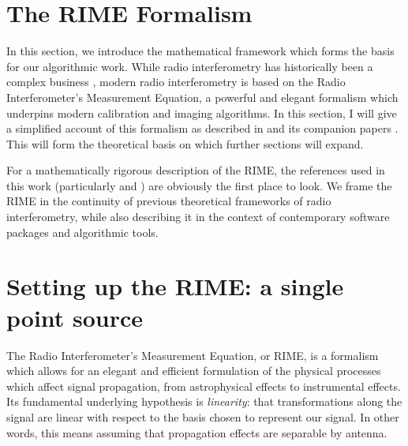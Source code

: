 
\section{The RIME Formalism}\label{section.RIME}

\pg
In this section, we introduce the mathematical framework which forms the basis for our algorithmic work.
While radio interferometry has historically been a complex business , modern radio interferometry is based on the Radio Interferometer's Measurement Equation, a powerful and elegant formalism which underpins modern calibration and imaging algorithms. In this section, I will give a simplified account of this formalism as described in  and its companion papers . This will form the theoretical basis on which further sections will expand.%

\pg
For a mathematically rigorous description of the RIME, the references used in this work (particularly  and ) are obviously the first place to look. We frame the RIME in the continuity of previous theoretical frameworks of radio interferometry, while also describing it in the context of contemporary software packages and algorithmic tools.

\section{Setting up the RIME: a single point source}
\label{section.RIME.setup}

\pg
The Radio Interferometer's Measurement Equation, or RIME, is a formalism which allows for an elegant and efficient formulation of the physical processes which affect signal propagation, from astrophysical effects to instrumental effects. Its fundamental underlying hypothesis is \emph{linearity}: that transformations along the signal are linear with respect to the basis chosen to represent our signal. In other words, this means assuming that propagation effects are separable by antenna.

